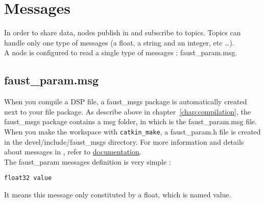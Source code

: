 \chapter{\faust Messages}
\label{chap:msgs}

In order to share data, \ros nodes publish in and subscribe to topics. Topics can handle only one type of messages (a float, a string and an integer, etc \dots).\\
A \faust node is configured to read a single type of messages : faust\_param.msg.

\section{faust\_param.msg}
When you compile a DSP file, a faust\_msgs package is automatically created next to your file package. As describe above in chapter~\ref{chap:compilation}, the faust\_msgs package contains a msg folder, in which is the faust\_param.msg file. 
When you make the workspace with \lstinline'catkin_make', a faust\_param.h file is created in the devel/include/faust\_msgs directory. For more information and details about messages in \ros, refer to \href{http://wiki.ros.org/msg}{\ros documentation}.\\
The faust\_param messages definition is very simple :
\begin{lstlisting}
float32 value
\end{lstlisting}
It means this message only constituted by a float, which is named value.
\newpage
